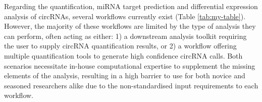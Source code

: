 \documentclass{bmcart}
\begin{document}
\par
Regarding the quantification, miRNA target prediction and differential expression analysis of circRNAs, several workflows currently exist (Table \ref{tab:my-table}). However, the majority of these workflows are limited by the type of analysis they can perform, often acting as either: 1) a downstream analysis toolkit requiring the user to supply circRNA quantification results, or 2) a workflow offering multiple quantification tools to generate high confidence circRNA calls. Both scenarios necessitate in-house computational expertise to supplement the missing elements of the analysis, resulting in a high barrier to use for both novice and seasoned researchers alike due to the non-standardised input requirements to each workflow.\par
\end{document}

